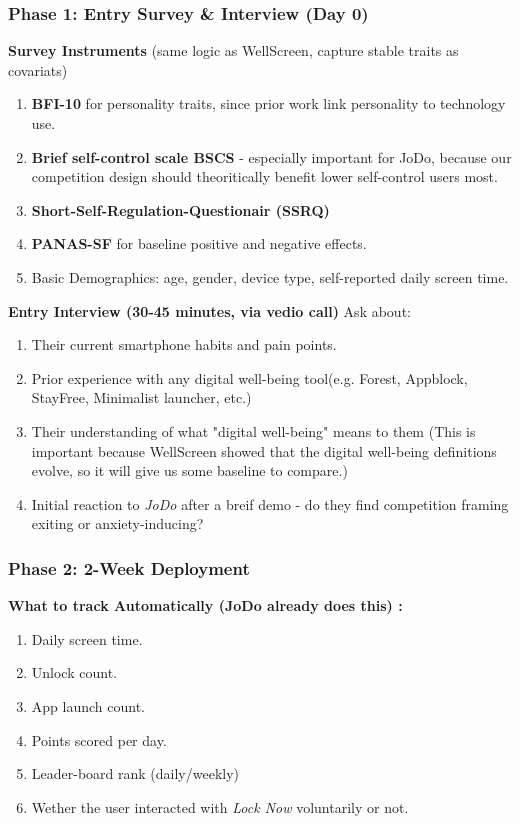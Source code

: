 \documentclass[12pt]{article}
\begin{document}
\subsubsection{Phase 1: Entry Survey \& Interview (Day 0)}
\textbf{Survey Instruments} (same logic as WellScreen, capture stable traits as covariats)
\begin{enumerate}
    \item \textbf{BFI-10} for personality traits, since prior work link personality to technology use.
    \item \textbf{Brief self-control scale BSCS} - especially important for JoDo, because our competition design should theoritically benefit lower self-control users most.
    \item \textbf{Short-Self-Regulation-Questionair (SSRQ)}
    \item \textbf{PANAS-SF} for baseline positive and negative effects.
    \item Basic Demographics: age, gender, device type, self-reported daily screen time.
\end{enumerate}
\textbf{Entry Interview (30-45 minutes, via vedio call)}
\newline
Ask about: 
\begin{enumerate}
    \item Their current smartphone habits and pain points.
    \item Prior experience with any digital well-being tool(e.g. Forest, Appblock, StayFree, Minimalist launcher, etc.)
    \item Their understanding of what "digital well-being" means to them (This is important because WellScreen showed that the digital well-being definitions evolve, so it will give us some baseline to compare.)
    \item Initial reaction to \textit{JoDo} after a breif demo - do they find competition framing exiting or anxiety-inducing?
\end{enumerate}
\subsubsection{Phase 2: 2-Week Deployment}
\textbf{What to track Automatically (JoDo already does this) : }
\begin{enumerate}
    \item Daily screen time.
    \item Unlock count.
    \item App launch count.
    \item Points scored per day.
    \item Leader-board rank (daily/weekly)
    \item Wether the user interacted with \textit{Lock Now} voluntarily or not.
\end{enumerate}
\end{document}
